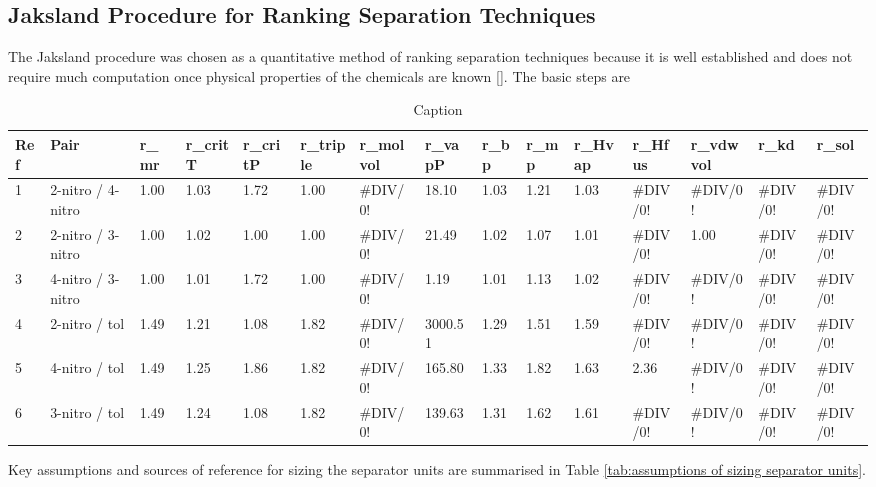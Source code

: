 \begin{landscape}
\subsection{Jaksland Procedure for Ranking Separation Techniques}
The Jaksland procedure was chosen as a quantitative method of ranking separation techniques because it is well established and does not require much computation once physical properties of the chemicals are known []. The basic steps are 
\begin{table}[h]
\centering
\caption{Caption}
\begin{tabular}{@{}lllllllllllllll@{}}
\toprule
Ref & Pair              & r\_mr & r\_critT & r\_critP & r\_triple & r\_molvol & r\_vapP & r\_bp & r\_mp & r\_Hvap & r\_Hfus  & r\_vdwvol & r\_kd    & r\_sol   \\ \midrule
1   & 2-nitro / 4-nitro & 1.00  & 1.03     & 1.72     & 1.00      & \#DIV/0!  & 18.10   & 1.03  & 1.21  & 1.03    & \#DIV/0! & \#DIV/0!  & \#DIV/0! & \#DIV/0! \\
2   & 2-nitro / 3-nitro & 1.00  & 1.02     & 1.00     & 1.00      & \#DIV/0!  & 21.49   & 1.02  & 1.07  & 1.01    & \#DIV/0! & 1.00      & \#DIV/0! & \#DIV/0! \\
3   & 4-nitro / 3-nitro & 1.00  & 1.01     & 1.72     & 1.00      & \#DIV/0!  & 1.19    & 1.01  & 1.13  & 1.02    & \#DIV/0! & \#DIV/0!  & \#DIV/0! & \#DIV/0! \\
4   & 2-nitro / tol     & 1.49  & 1.21     & 1.08     & 1.82      & \#DIV/0!  & 3000.51 & 1.29  & 1.51  & 1.59    & \#DIV/0! & \#DIV/0!  & \#DIV/0! & \#DIV/0! \\
5   & 4-nitro / tol     & 1.49  & 1.25     & 1.86     & 1.82      & \#DIV/0!  & 165.80  & 1.33  & 1.82  & 1.63    & 2.36     & \#DIV/0!  & \#DIV/0! & \#DIV/0! \\
6   & 3-nitro / tol     & 1.49  & 1.24     & 1.08     & 1.82      & \#DIV/0!  & 139.63  & 1.31  & 1.62  & 1.61    & \#DIV/0! & \#DIV/0!  & \#DIV/0! & \#DIV/0! \\ \bottomrule
\end{tabular}
\end{table}
\label{app:sizing}


Key assumptions and sources of reference for sizing the separator units are summarised in Table \ref{tab:assumptions of sizing separator units}.



\end{landscape}
